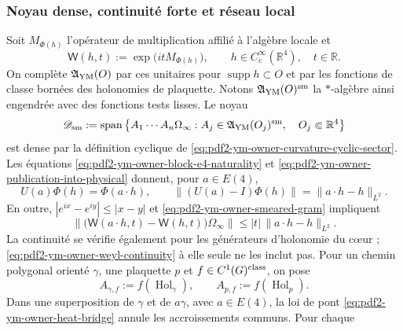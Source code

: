 \subsubsection{Noyau dense, continuité forte et réseau local}

Soit $M_{\Phi(h)}$ l'opérateur de multiplication affilié à l'algèbre locale et
\begin{equation}\label{eq:pdf2-ym-owner-curvature-weyl}
 \mathsf W(h,t):=\exp\!\bigl(itM_{\Phi(h)}\bigr),
 \qquad h\in C_c^\infty(\mathbb R^4),\quad t\in\mathbb R.
\end{equation}
On complète $\mathfrak A_{\rm YM}(O)$ par ces unitaires pour
$\operatorname{supp}h\subset O$ et par les fonctions de classe bornées des
holonomies de plaquette. Notons $\mathfrak A_{\rm YM}(O)^{\rm sm}$ la
$*$-algèbre ainsi engendrée avec des fonctions tests lisses. Le noyau
\begin{equation}\label{eq:pdf2-ym-owner-smooth-core}
 \mathscr D_{\rm sm}:=\operatorname{span}\left\{
 A_1\cdots A_n\Omega_\infty:
 A_j\in\mathfrak A_{\rm YM}(O_j)^{\rm sm},\quad
 O_j\Subset\mathbb R^4\right\}
\end{equation}
est dense par la définition cyclique de \eqref{eq:pdf2-ym-owner-curvature-cyclic-sector}. Les équations \eqref{eq:pdf2-ym-owner-block-e4-naturality} et \eqref{eq:pdf2-ym-owner-publication-into-physical} donnent, pour $a\in E(4)$,
\begin{equation}\label{eq:pdf2-ym-owner-field-e4-covariance}
 U(a)\Phi(h)=\Phi(a\!\cdot h),
 \qquad
 \|(U(a)-I)\Phi(h)\|=\|a\!\cdot h-h\|_{L^2}.
\end{equation}
En outre, $|e^{ix}-e^{iy}|\le|x-y|$ et
\eqref{eq:pdf2-ym-owner-smeared-gram} impliquent
\begin{equation}\label{eq:pdf2-ym-owner-weyl-continuity}
 \|\bigl(\mathsf W(a\!\cdot h,t)-\mathsf W(h,t)\bigr)\Omega_\infty\|
 \le |t|\,\|a\!\cdot h-h\|_{L^2}.
\end{equation}
La continuité se vérifie également pour les générateurs d'holonomie du cœur ; \eqref{eq:pdf2-ym-owner-weyl-continuity} à elle seule ne les inclut pas. Pour un chemin polygonal orienté $\gamma$, une plaquette $p$ et $f\in C^1(G)^{\rm class}$, on pose
\begin{equation}\label{eq:pdf2-ym-owner-holonomy-core-generators}
 A_{\gamma,f}:=f(\operatorname{Hol}_\gamma),
 \qquad A_{p,f}:=f(\operatorname{Hol}_p).
\end{equation}
Dans une superposition de $\gamma$ et de $a\gamma$, avec $a\in E(4)$, la loi de pont
\eqref{eq:pdf2-ym-owner-heat-bridge} annule les accroissements communs. Pour chaque
